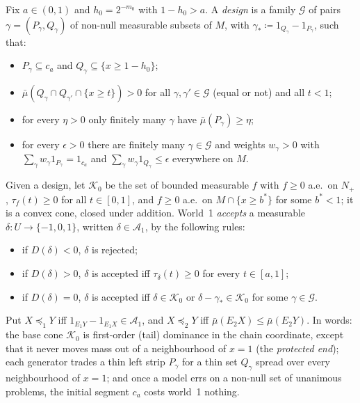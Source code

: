 \documentclass[11pt]{article}
\theoremstyle{definition}
\theoremstyle{remark}
\begin{document}
Fix $a\in(0,1)$ and $h_0=2^{-m_0}$ with $1-h_0>a$. A \emph{design} is a family $\mathcal G$ of pairs $\gamma=(P_\gamma,Q_\gamma)$ of non-null measurable subsets of $M$, with $\gamma_*\coloneqq1_{Q_\gamma}-1_{P_\gamma}$, such that:
\begin{itemize}[leftmargin=*]
\item[\textbf{(d1)}] $P_\gamma\subseteq c_a$ and $Q_\gamma\subseteq\{x\ge1-h_0\}$;
\item[\textbf{(d2)}] $\bar\mu(Q_\gamma\cap Q_{\gamma'}\cap\{x\ge t\})>0$ for all $\gamma,\gamma'\in\mathcal G$ (equal or not) and all $t<1$;
\item[\textbf{(d3)}] for every $\eta>0$ only finitely many $\gamma$ have $\bar\mu(P_\gamma)\ge\eta$;
\item[\textbf{(d4)}] for every $\epsilon>0$ there are finitely many $\gamma\in\mathcal G$ and weights $w_\gamma>0$ with $\sum_\gamma w_\gamma1_{P_\gamma}=1_{c_a}$ and $\sum_\gamma w_\gamma1_{Q_\gamma}\le\epsilon$ everywhere on $M$.
\end{itemize}
Given a design, let $\mathcal K_0$ be the set of bounded measurable $f$ with $f\ge0$ a.e.\ on $N_+$, $\tau_f(t)\ge0$ for all $t\in[0,1]$, and $f\ge0$ a.e.\ on $M\cap\{x\ge b^*\}$ for some $b^*<1$; it is a convex cone, closed under addition. World~1 \emph{accepts} a measurable $\delta:U\to\{-1,0,1\}$, written $\delta\in\mathcal A_1$, by the following rules:
\begin{itemize}[leftmargin=*]
\item[\textbf{(R$^-$)}] if $D(\delta)<0$, $\delta$ is rejected;
\item[\textbf{(R$^+$)}] if $D(\delta)>0$, $\delta$ is accepted iff $\tau_\delta(t)\ge0$ for every $t\in[a,1]$;
\item[\textbf{(R$^0$)}] if $D(\delta)=0$, $\delta$ is accepted iff $\delta\in\mathcal K_0$ or $\delta-\gamma_*\in\mathcal K_0$ for some $\gamma\in\mathcal G$.
\end{itemize}
Put $X\preceq_1Y$ iff $1_{E_1Y}-1_{E_1X}\in\mathcal A_1$, and $X\preceq_2Y$ iff $\bar\mu(E_2X)\le\bar\mu(E_2Y)$. In words: the base cone $\mathcal K_0$ is first-order (tail) dominance in the chain coordinate, except that it never moves mass out of a neighbourhood of $x=1$ (the \emph{protected end}); each generator trades a thin left strip $P_\gamma$ for a thin set $Q_\gamma$ spread over every neighbourhood of $x=1$; and once a model errs on a non-null set of unanimous problems, the initial segment $c_a$ costs world~1 nothing.
\end{document}
